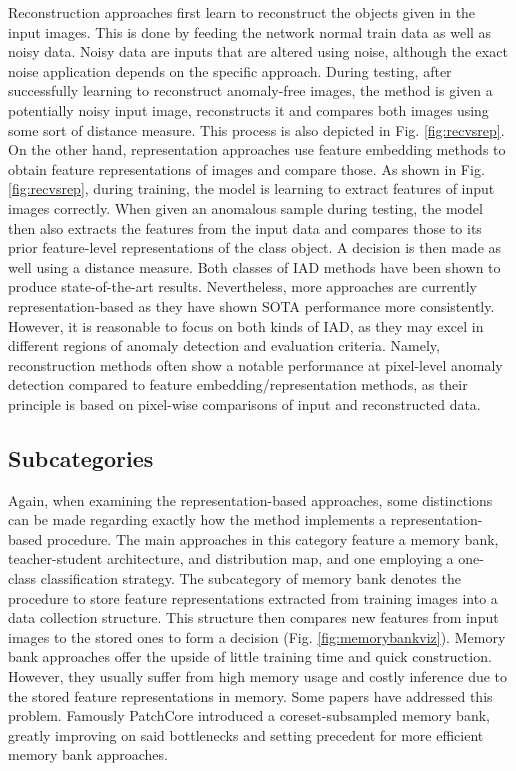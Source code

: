 Reconstruction approaches first learn to reconstruct the objects given in the input images. This is done by feeding the network normal train data as well as noisy data. Noisy data are inputs
that are altered using noise, although the exact noise application depends on the specific approach. During testing, after successfully learning to 
reconstruct anomaly-free images, the method is given a potentially noisy input image, reconstructs it and compares both images using some sort of distance measure. This process is also depicted in Fig. \ref{fig:recvsrep}. 
On the other hand, representation approaches use feature embedding methods to obtain feature representations of images and compare those. As shown in Fig. \ref{fig:recvsrep}, during training, the model is 
learning to extract features of input images correctly. When given an anomalous sample during testing, the model then also extracts the features from the input data and compares those to its 
prior feature-level representations of the class object. A decision is then made as well using a distance measure.\newline
Both classes of IAD methods have been shown to produce state-of-the-art results. Nevertheless, more approaches are currently representation-based \cite{liu2024deep} as they have shown SOTA performance more 
consistently. However, it is reasonable to focus on both kinds of IAD, as they may excel in different regions of anomaly detection and evaluation criteria. Namely, reconstruction methods often show a notable performance at pixel-level anomaly detection compared to feature embedding/representation methods, as their principle is based on pixel-wise comparisons of input 
and reconstructed data.



\subsection{Subcategories}

Again, when examining the representation-based approaches, some distinctions can be made regarding exactly how the method implements a representation-based procedure.
The main approaches in this category feature a memory bank, teacher-student architecture, and distribution map, and one employing a one-class classification strategy. The subcategory of 
memory bank denotes the procedure to store feature representations extracted from training images into a data collection structure. This structure then compares new 
features from input images to the stored ones to form a decision (Fig. \ref{fig:memorybankviz}). Memory bank approaches offer the upside of little training time and quick construction. However, they usually suffer from high memory 
usage and costly inference due to the stored feature representations in memory. Some papers have addressed this problem. Famously PatchCore \cite{patchCore2022} introduced a coreset-subsampled 
memory bank, greatly improving on said bottlenecks and setting precedent for more efficient memory bank approaches. \newline


